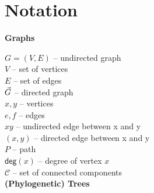 \documentclass[hidelinks,11pt]{scrreprt}
\def\arrowedvec{\mathaccent"017E}
\newcommand{\G}{\arrowedvec{G}}
\newcommand{\degree}{\mathsf{deg}}
\begin{document}




\section*{Notation}

\vspace{5mm}
{\renewcommand{\baselinestretch}{1.12}\footnotesize
	\begin{minipage}[t]{0.47\textwidth}
		\textbf{Graphs}
		
		\vspace{2mm}
		\noindent
		$G=(V,E)$ -- undirected graph\\
		$V$ -- set of vertices\\
		$E$ -- set of edges\\
		$\G$ -- directed graph\\
		$x,y$ -- vertices\\
		$e,f$ -- edges\\
		$xy$ -- undirected edge between x and y\\
		$(x,y)$ -- directed edge between x and y\\
		$P$ -- path\\
		$\degree(x)$ -- degree of vertex $x$\\
		$\mathcal{C}$ -- set of connected components\\
		
		\noindent
		\textbf{(Phylogenetic) Trees}
		

\end{minipage}}
\end{document}
